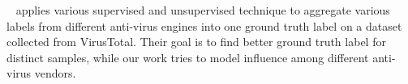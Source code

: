 ~\citet{betterGT} applies various supervised and unsupervised 
technique to aggregate various labels from different anti-virus engines into one ground truth label 
on a dataset collected from VirusTotal. 
Their goal is to find better ground truth label for distinct samples, 
while our work tries to model influence among different anti-virus vendors.  


